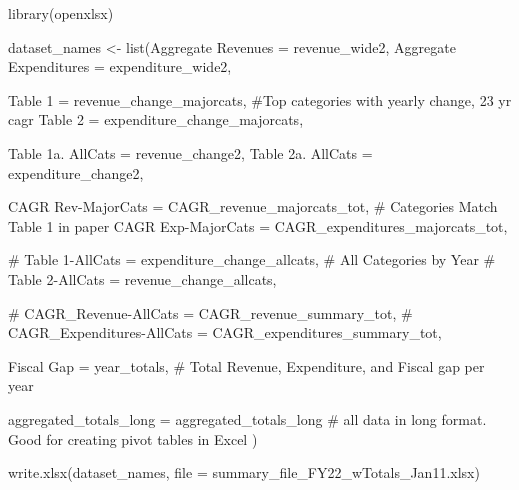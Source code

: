 \documentclass[
  letterpaper,
  DIV=11,
  numbers=noendperiod]{scrreport}
\newenvironment{Shaded}{\begin{snugshade}}{\end{snugshade}}
\newcommand{\AttributeTok}[1]{\textcolor[rgb]{0.40,0.45,0.13}{#1}}
\newcommand{\CommentTok}[1]{\textcolor[rgb]{0.37,0.37,0.37}{#1}}
\newcommand{\FunctionTok}[1]{\textcolor[rgb]{0.28,0.35,0.67}{#1}}
\newcommand{\NormalTok}[1]{\textcolor[rgb]{0.00,0.23,0.31}{#1}}
\newcommand{\OtherTok}[1]{\textcolor[rgb]{0.00,0.23,0.31}{#1}}
\newcommand{\StringTok}[1]{\textcolor[rgb]{0.13,0.47,0.30}{#1}}
\begin{document}
\begin{Shaded}
\begin{Highlighting}[]
\FunctionTok{library}\NormalTok{(openxlsx)}

\NormalTok{dataset\_names }\OtherTok{\textless{}{-}} \FunctionTok{list}\NormalTok{(}\StringTok{\textquotesingle{}Aggregate Revenues\textquotesingle{}} \OtherTok{=}\NormalTok{ revenue\_wide2, }
                      \StringTok{\textquotesingle{}Aggregate Expenditures\textquotesingle{}} \OtherTok{=}\NormalTok{ expenditure\_wide2, }

                      
                      \StringTok{\textquotesingle{}Table 1\textquotesingle{}} \OtherTok{=}\NormalTok{ revenue\_change\_majorcats, }\CommentTok{\#Top categories with yearly change, 23 yr cagr}
                      \StringTok{\textquotesingle{}Table 2\textquotesingle{}} \OtherTok{=}\NormalTok{ expenditure\_change\_majorcats,}
                      
                      \StringTok{\textquotesingle{}Table 1a. AllCats\textquotesingle{}} \OtherTok{=}\NormalTok{ revenue\_change2,}
                      \StringTok{\textquotesingle{}Table 2a. AllCats\textquotesingle{}} \OtherTok{=}\NormalTok{ expenditure\_change2,}
                      
                      \StringTok{\textquotesingle{}CAGR Rev{-}MajorCats\textquotesingle{}} \OtherTok{=}\NormalTok{ CAGR\_revenue\_majorcats\_tot, }\CommentTok{\# Categories Match Table 1 in paper}
                      \StringTok{\textquotesingle{}CAGR Exp{-}MajorCats\textquotesingle{}} \OtherTok{=}\NormalTok{ CAGR\_expenditures\_majorcats\_tot, }
                                            
                     \CommentTok{\# \textquotesingle{}Table 1{-}AllCats\textquotesingle{} = expenditure\_change\_allcats,  \# All Categories by Year}
                    \CommentTok{\#  \textquotesingle{}Table 2{-}AllCats\textquotesingle{} = revenue\_change\_allcats,}
                      
                    \CommentTok{\#  \textquotesingle{}CAGR\_Revenue{-}AllCats\textquotesingle{} = CAGR\_revenue\_summary\_tot, }
                   \CommentTok{\#   \textquotesingle{}CAGR\_Expenditures{-}AllCats\textquotesingle{} = CAGR\_expenditures\_summary\_tot, }
                      
                      \StringTok{\textquotesingle{}Fiscal Gap\textquotesingle{}} \OtherTok{=}\NormalTok{ year\_totals,    }\CommentTok{\# Total Revenue, Expenditure, and Fiscal gap per year}
                      
                      \StringTok{\textquotesingle{}aggregated\_totals\_long\textquotesingle{}} \OtherTok{=}\NormalTok{ aggregated\_totals\_long }\CommentTok{\# all data in long format. Good for creating pivot tables in Excel}
\NormalTok{                      )}

\FunctionTok{write.xlsx}\NormalTok{(dataset\_names, }\AttributeTok{file =} \StringTok{\textquotesingle{}summary\_file\_FY22\_wTotals\_Jan11.xlsx\textquotesingle{}}\NormalTok{)}
\end{Highlighting}
\end{Shaded}
\end{document}
